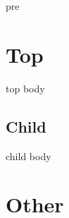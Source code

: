 pre
\section{Top}
\label{sec:org824ce29}
top body
\subsection{Child}
\label{sec:orgb4d6138}
child body
\section{Other}
\label{sec:org64090f9}
